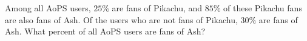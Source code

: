 Among all AoPS users, $25\%$ are fans of Pikachu, and $85\%$ of these Pikachu fans are also fans of Ash. Of the users who are not fans of Pikachu, $30\%$ are fans of Ash. What percent of all AoPS users are fans of Ash?
